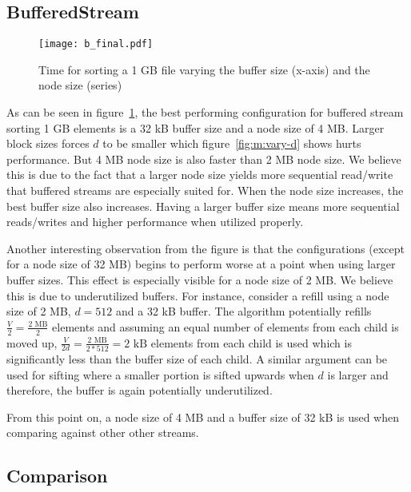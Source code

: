 \subsection{BufferedStream}

\begin{figure}[h!]
  \centering
  \texttt{[image: b\_final.pdf]}
  \caption{Time for sorting a 1 GB file varying the buffer size (x-axis) and the node size (series)}
  \label{fig:b_final}
\end{figure}

As can be seen in figure~\ref{fig:b_final}, the best performing configuration for buffered stream sorting 1 GB elements is a 32 kB buffer size and a node size of 4 MB. Larger block sizes forces $d$ to be smaller which figure~\ref{fig:m:vary-d} shows hurts performance. But 4 MB node size is also faster than 2 MB node size. We believe this is due to the fact that a larger node size yields more sequential read/write that buffered streams are especially suited for. When the node size increases, the best buffer size also increases. Having a larger buffer size means more sequential reads/writes and higher performance when utilized properly.

Another interesting observation from the figure is that the configurations (except for a node size of 32 MB) begins to perform worse at a point when using larger buffer sizes. This effect is especially visible for a node size of 2 MB. We believe this is due to underutilized buffers. For instance, consider a refill using a node size of 2 MB, $d=512$ and a 32 kB buffer. The algorithm potentially refills $\frac{V}{2}=\frac{\textrm{2 MB}}{2}$ elements and assuming an equal number of elements from each child is moved up, $\frac{V}{2d}=\frac{\textrm{2 MB}}{2*512}=\textrm{2 kB}$ elements from each child is used which is significantly less than the buffer size of each child. A similar argument can be used for sifting where a smaller portion is sifted upwards when $d$ is larger and therefore, the buffer is again potentially underutilized.


From this point on, a node size of 4 MB and a buffer size of 32 kB is used when comparing against other other streams.

\subsection{Comparison}

